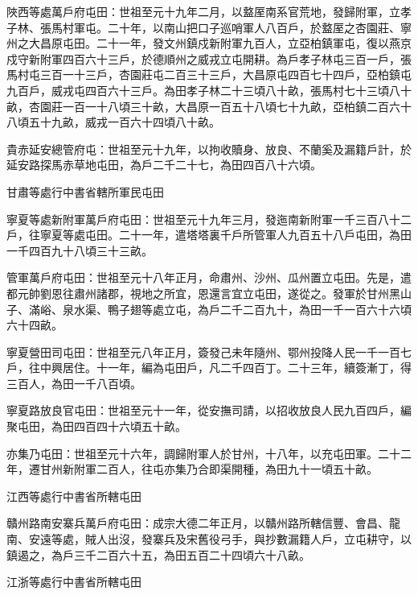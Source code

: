 \begin{pinyinscope}
 陜西等處萬戶府屯田：世祖至元十九年二月，以盩厔南系官荒地，發歸附軍，立孝子林、張馬村軍屯。二十年，以南山把口子巡哨軍人八百戶，於盩厔之杏園莊、寧州之大昌原屯田。二十一年，發文州鎮戍新附軍九百人，立亞柏鎮軍屯，復以燕京戍守新附軍四百六十三戶，於德順州之威戎立屯開耕。為戶孝子林屯三百一戶，張馬村屯三百一十三戶，杏園莊屯二百三十三戶，大昌原屯四百七十四戶，亞柏鎮屯九百戶，威戎屯四百六十三戶。為田孝子林二十三頃八十畝，張馬村七十三頃八十畝，杏園莊一百一十八頃三十畝，大昌原一百五十八頃七十九畝，亞柏鎮二百六十八頃五十九畝，威戎一百六十四頃八十畝。



 貴赤延安總管府屯：世祖至元十九年，以拘收贖身、放良、不蘭奚及漏籍戶計，於延安路探馬赤草地屯田，為戶二千二十七，為田四百八十六頃。



 甘肅等處行中書省轄所軍民屯田



 寧夏等處新附軍萬戶府屯田：世祖至元十九年三月，發迤南新附軍一千三百八十二戶，往寧夏等處屯田。二十一年，遣塔塔裏千戶所管軍人九百五十八戶屯田，為田一千四百九十八頃三十三畝。



 管軍萬戶府屯田：世祖至元十八年正月，命肅州、沙州、瓜州置立屯田。先是，遣都元帥劉恩往肅州諸郡，視地之所宜，恩還言宜立屯田，遂從之。發軍於甘州黑山子、滿峪、泉水渠、鴨子翅等處立屯，為戶二千二百九十，為田一千一百六十六頃六十四畝。



 寧夏營田司屯田：世祖至元八年正月，簽發己未年隨州、鄂州投降人民一千一百七戶，往中興居住。十一年，編為屯田戶，凡二千四百丁。二十三年，續簽漸丁，得三百人，為田一千八百頃。



 寧夏路放良官屯田：世祖至元十一年，從安撫司請，以招收放良人民九百四戶，編聚屯田，為田四百四十六頃五十畝。



 亦集乃屯田：世祖至元十六年，調歸附軍人於甘州，十八年，以充屯田軍。二十二年，遷甘州新附軍二百人，往屯亦集乃合即渠開種，為田九十一頃五十畝。



 江西等處行中書省所轄屯田



 贛州路南安寨兵萬戶府屯田：成宗大德二年正月，以贛州路所轄信豐、會昌、龍南、安遠等處，賊人出沒，發寨兵及宋舊役弓手，與抄數漏籍人戶，立屯耕守，以鎮遏之，為戶三千二百六十五，為田五百二十四頃六十八畝。



 江浙等處行中書省所轄屯田




\end{pinyinscope}
